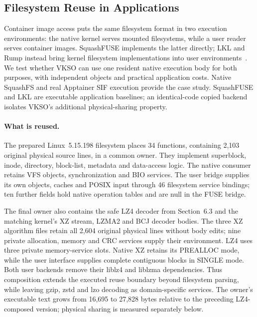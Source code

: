 \subsection{Filesystem Reuse in Applications}
\label{sec:filesystem-reuse}

Container image access puts the same filesystem format in two execution
environments: the native kernel serves mounted filesystems, while a user
reader serves container images. SquashFUSE implements the latter directly;
LKL and Rump instead bring kernel filesystem implementations into user
environments~\cite{ev_squashfuse062,ev_lkl_source,kantee2009rump}.
We test whether VKSO can use one resident native execution body for both
purposes, with independent objects and practical application costs.
Native SquashFS and real Apptainer SIF execution provide the case study.
SquashFUSE and LKL are executable application baselines; an identical-code
copied backend isolates VKSO's additional physical-sharing property.

\paragraph{What is reused.}
The prepared Linux~5.15.198 filesystem places 34 functions, containing
2,103 original physical source lines, in a common owner. They implement
superblock, inode, directory, block-list, metadata and data-access logic.
The native consumer retains VFS objects, synchronization and BIO services.
The user bridge supplies its own objects, caches and POSIX input through
46 filesystem service bindings; ten further fields hold native operation
tables and are null in the FUSE bridge.

The final owner also contains the safe LZ4 decoder from Section~6.3 and the
matching kernel's XZ stream, LZMA2 and BCJ decoder bodies. The three XZ
algorithm files retain all 2,604 original physical lines without body edits;
nine private allocation, memory and CRC services supply their environment.
LZ4 uses three private memory-service slots. Native XZ retains its PREALLOC
mode, while the user interface supplies complete contiguous blocks in SINGLE
mode. Both user backends remove their liblz4 and liblzma dependencies.
Thus composition extends the executed reuse boundary beyond filesystem
parsing, while leaving gzip, zstd and lzo decoding as domain-specific services.
The owner's executable text grows from 16,695 to 27,828 bytes relative to the
preceding LZ4-composed version; physical sharing is measured separately below.

